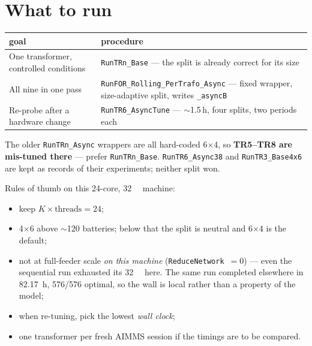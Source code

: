 \documentclass[11pt,a4paper]{article}
\begin{document}
\section{What to run}

\begin{center}
\begin{tabular}{@{}p{} p{}@{}}
\toprule
\textbf{goal} & \textbf{procedure} \\
\midrule
One transformer, controlled conditions & \texttt{RunTRn\_Base} --- the split is already correct for its size \\
All nine in one pass & \texttt{RunFOR\_Rolling\_PerTrafo\_Async} --- fixed wrapper, size-adaptive split, writes \texttt{\_asyncB} \\
Re-probe after a hardware change & \texttt{RunTR6\_AsyncTune} --- $\sim$1.5\,h, four splits, two periods each \\
\bottomrule
\end{tabular}
\end{center}

\begin{warnbox}
The older \texttt{RunTRn\_Async} wrappers are all hard-coded 6$\times$4, so
\textbf{TR5--TR8 are mis-tuned there} --- prefer \texttt{RunTRn\_Base}.
\texttt{RunTR6\_Async38} and \texttt{RunTR3\_Base4x6} are kept as records of
their experiments; neither split won.
\end{warnbox}

Rules of thumb on this 24-core, \SI{32}{\giga\byte} machine:

\begin{itemize}
  \item keep $K \times \text{threads} = 24$;
  \item 4$\times$6 above $\sim$120 batteries; below that the split is neutral and
        6$\times$4 is the default;
  \item not at full-feeder scale \emph{on this machine}
        (\texttt{ReduceNetwork}~$=0$) --- even the sequential run exhausted its
        \SI{32}{\giga\byte} here. The same run completed elsewhere in
        \SI{82.17}{\hour}, 576/576 optimal, so the wall is local rather than a
        property of the model;
  \item when re-tuning, pick the lowest \emph{wall clock};
  \item one transformer per fresh AIMMS session if the timings are to be compared.
\end{itemize}
\end{document}
